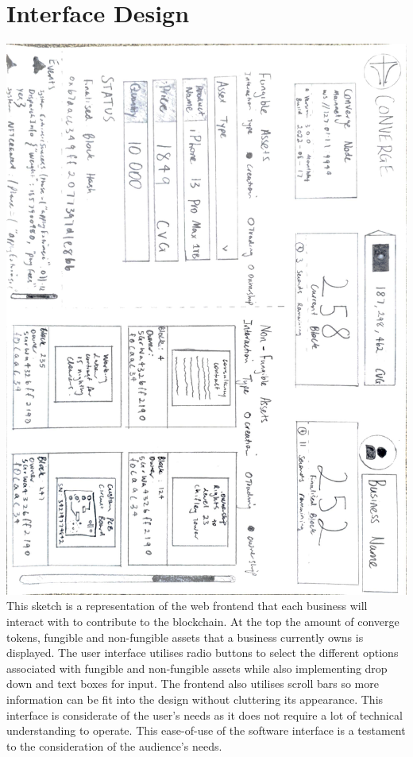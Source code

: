 \let\textcircled=\pgftextcircled
\chapter{Interface Design}

\includegraphics[width=\linewidth]{figures/ui1.png} \\

This sketch is a representation of the web frontend that each business will interact with to contribute to the blockchain. At the top the amount of converge tokens, fungible and non-fungible assets that a business currently owns is displayed. The user interface utilises radio buttons to select the different options associated with fungible and non-fungible assets while also implementing drop down and text boxes for input. The frontend also utilises scroll bars so more information can be fit into the design without cluttering its appearance. This interface is considerate of the user’s needs as it does not require a lot of technical understanding to operate. This ease-of-use of the software interface is a testament to the consideration of the audience’s needs.
